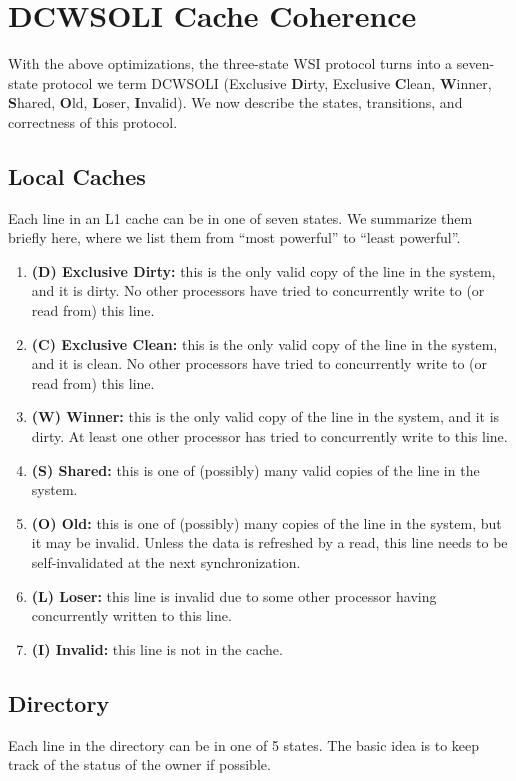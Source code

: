 \documentclass{article}
\begin{document}
\section{DCWSOLI Cache Coherence}
With the above optimizations, the three-state WSI protocol turns into a seven-state protocol we term DCWSOLI (Exclusive \textbf{D}irty, Exclusive \textbf{C}lean, \textbf{W}inner, \textbf{S}hared, \textbf{O}ld, \textbf{L}oser, \textbf{I}nvalid). We now describe the states, transitions, and correctness of this protocol.

\subsection{Local Caches}
Each line in an L1 cache can be in one of seven states. We summarize them briefly here, where we list them from ``most powerful'' to ``least powerful''.

\begin{enumerate}
\item \textbf{(D) Exclusive Dirty:} this is the only valid copy of the line in the system, and it is dirty. No other processors have tried to concurrently write to (or read from) this line.
\item \textbf{(C) Exclusive Clean:} this is the only valid copy of the line in the system, and it is clean. No other processors have tried to concurrently write to (or read from) this line.
\item \textbf{(W) Winner:} this is the only valid copy of the line in the system, and it is dirty. At least one other processor has tried to concurrently write to this line.
\item \textbf{(S) Shared:} this is one of (possibly) many valid copies of the line in the system.
\item \textbf{(O) Old:} this is one of (possibly) many copies of the line in the system, but it may be invalid. Unless the data is refreshed by a read, this line needs to be self-invalidated at the next synchronization.
\item \textbf{(L) Loser:} this line is invalid due to some other processor having concurrently written to this line.
\item \textbf{(I) Invalid:} this line is not in the cache.
\end{enumerate}

\subsection{Directory}
Each line in the directory can be in one of 5 states. The basic idea is to keep track of the status of the owner if possible.
\end{document}
